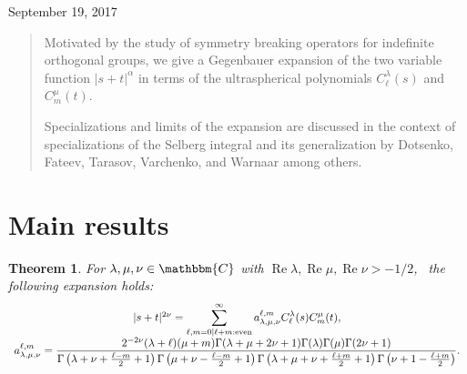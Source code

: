 \documentclass[12pt]{article}
\numberwithin{equation}{section}
\newcommand{\tmop}[1]{\ensuremath{\operatorname{#1}}}
\newtheorem{theorem}[corollary]{Theorem}
\newcommand{\mygrammarfootnote}[1]{}
\begin{document}
September 19, 2017

\begin{abstract}
  Motivated by the study of symmetry breaking operators for indefinite
  orthogonal groups, we give a Gegenbauer expansion of the two variable
  function $| s + t |^{\alpha}$ in terms of the ultraspherical polynomials
  $C_{\ell}^{\lambda} (s)$ and $C^{\mu}_m (t)$.
  
  Specializations and limits of the expansion are discussed in the context of
  specializations of the Selberg integral and its
  generalization\mygrammarfootnote{maybe, ``generalization'' should be in plural (i.e.
  ``generalizations'')?} by Dotsenko, Fateev, Tarasov, Varchenko, and Warnaar
  among others.
\end{abstract}

\section{Main results}

\begin{theorem}
  For $\lambda, \mu, \nu \in \mathbbm{C}$ with $\tmop{Re} \lambda, \tmop{Re}
  \mu, \tmop{Re} \nu > - 1 / 2$, \ the following expansion holds:
  \begin{equation*}
	  \begin{array}[]{c}
     | s + t |^{2 \nu} = \displaystyle\sum_{\ell, m = 0 \mid \ell + m :
    \tmop{even}}^{\infty} a_{\lambda, \mu, \nu}^{\ell, m} C_{\ell}^{\lambda}
    (s) C_m^{\mu} (t), \\
     \displaystyle a_{\lambda, \mu, \nu}^{\ell, m} = \frac{2^{- 2 \nu} (\lambda + \ell)
    (\mu + m) \Gamma (\lambda + \mu + 2 \nu + 1) \Gamma (\lambda) \Gamma (\mu)
    \Gamma (2 \nu + 1)}{\Gamma \left( \lambda + \nu + \frac{\ell - m}{2} + 1
    \right) \Gamma \left( \mu + \nu - \frac{\ell - m}{2} + 1 \right) \Gamma
    \left( \lambda + \mu + \nu + \frac{\ell + m}{2} + 1 \right) \Gamma \left(
    \nu + 1 - \frac{\ell + m}{2} \right)} .
	  \end{array}
  \end{equation*}
\end{theorem}
\end{document}

